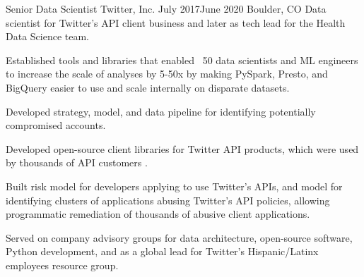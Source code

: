 \documentclass[print]{ag-cv} %
\begin{document}
\begin{job}
  {Senior Data Scientist}
  {Twitter, Inc.}
  {July 2017}{June 2020}
  {Boulder, CO}
  {
  Data scientist for Twitter's API client business and later as tech lead for the Health Data Science team. 
  }
{
    \begin{myitemize}
      \item Established tools and libraries that enabled ~50 data scientists and
      ML engineers to increase the scale of analyses by 5-50x by making PySpark,
      Presto, and BigQuery easier to use and scale internally on disparate
      datasets.
      
      \item Developed strategy, model, and data pipeline for identifying
      potentially compromised accounts.
      
      \item Developed open-source client libraries for Twitter API products, which
      were used by thousands of API customers
      \autocite{search_tweets_python,do_more_with_twitter_data}.
      
      \item Built risk model for developers applying to use Twitter's APIs, and
      model for identifying clusters of applications abusing Twitter's API
      policies, allowing programmatic remediation of thousands of abusive client
      applications.
      
      \item Served on company advisory groups for data architecture, open-source
      software, Python development, and as a global lead for Twitter's
      Hispanic/Latinx employees resource group.
    \end{myitemize}
    } 

\end{job}
\end{document}
